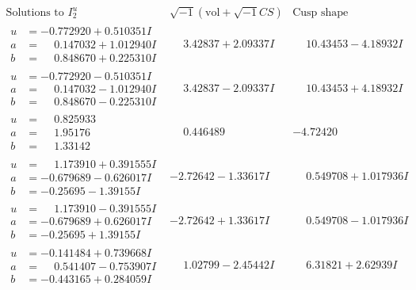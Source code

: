 \documentclass[1p]{elsarticle_modified}
\theoremstyle{definition}
\newcommand{\I}{\sqrt{-1}}
\begin{document}
$$\begin{array}{c|c|c}  
\text{Solutions to }I^u_{2}& \I (\text{vol} + \sqrt{-1}CS) & \text{Cusp shape}\\
 \hline 
\begin{aligned}
u &= -0.772920 + 0.510351 I \\
a &= \phantom{-}0.147032 + 1.012940 I \\
b &= \phantom{-}0.848670 + 0.225310 I\end{aligned}
 & \phantom{-}3.42837 + 2.09337 I & \phantom{-}10.43453 - 4.18932 I \\ \hline\begin{aligned}
u &= -0.772920 - 0.510351 I \\
a &= \phantom{-}0.147032 - 1.012940 I \\
b &= \phantom{-}0.848670 - 0.225310 I\end{aligned}
 & \phantom{-}3.42837 - 2.09337 I & \phantom{-}10.43453 + 4.18932 I \\ \hline\begin{aligned}
u &= \phantom{-}0.825933\phantom{ +0.000000I} \\
a &= \phantom{-}1.95176\phantom{ +0.000000I} \\
b &= \phantom{-}1.33142\phantom{ +0.000000I}\end{aligned}
 & \phantom{-}0.446489\phantom{ +0.000000I} & -4.72420\phantom{ +0.000000I} \\ \hline\begin{aligned}
u &= \phantom{-}1.173910 + 0.391555 I \\
a &= -0.679689 - 0.626017 I \\
b &= -0.25695 - 1.39155 I\end{aligned}
 & -2.72642 - 1.33617 I & \phantom{-}0.549708 + 1.017936 I \\ \hline\begin{aligned}
u &= \phantom{-}1.173910 - 0.391555 I \\
a &= -0.679689 + 0.626017 I \\
b &= -0.25695 + 1.39155 I\end{aligned}
 & -2.72642 + 1.33617 I & \phantom{-}0.549708 - 1.017936 I \\ \hline\begin{aligned}
u &= -0.141484 + 0.739668 I \\
a &= \phantom{-}0.541407 - 0.753907 I \\
b &= -0.443165 + 0.284059 I\end{aligned}
 & \phantom{-}1.02799 - 2.45442 I & \phantom{-}6.31821 + 2.62939 I \\ \hline\begin{aligned}

\end{aligned}
\end{array}$$
\end{document}
